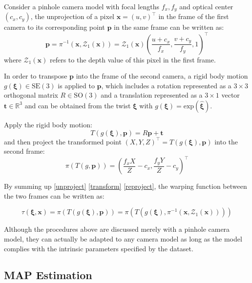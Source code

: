 \documentclass[acmsmall, nonacm, 11pt]{acmart}
\begin{document}
Consider a pinhole camera model with focal lengths $f_x, f_y$ and optical center $(c_x, c_y)$, the unprojection of a pixel $\mathbf{x} = (u, v)^{\top}$ in the frame of the first camera to its corresponding point $\mathbf{p}$ in the same frame can be written as:
\begin{equation}
\mathbf{p} = \pi^{-1}\left(\mathbf{x}, \mathcal{Z}_1(\mathbf{x})\right) = \mathcal{Z}_{1}(\mathbf{x})\left(\frac{u+c_x}{f_x}, \frac{v+c_y}{f_y}, 1\right)^{\top}
\label{unproject}
\end{equation}
\noindent where $\mathcal{Z}_1(\mathbf{x})$ refers to the depth value of this pixel in the first frame.

In order to transpose $\mathbf{p}$ into the frame of the second camera, a rigid body motion $g(\boldsymbol{\xi}) \in \mathrm{SE(3)}$ is applied to $\mathbf{p}$, which includes a rotation represented as a $3 \times 3$ orthogonal matrix $R \in \mathrm{SO(3)}$ and a translation represented as a $3 \times 1$ vector $\mathbf{t} \in \mathbb{R}^3$ and can be obtained from the twist $\boldsymbol{\xi}$ with $g(\boldsymbol{\xi}) = \mathrm{exp}(\hat{\boldsymbol{\xi}})$.

Apply the rigid body motion:
\begin{equation}
T(g(\boldsymbol{\xi}), \mathbf{p})=R \mathbf{p}+\mathbf{t}
\label{transform}
\end{equation}
and then project the transformed point $(X, Y, Z)^{\top} = T(g(\boldsymbol{\xi}), \mathbf{p})$ into the second frame:
\begin{equation}
\pi(T(g, \mathbf{p}))=\left(\frac{f_x X}{Z}-c_x, \frac{f_y Y}{Z}-c_y\right)^{\top}
\label{reproject}
\end{equation}

By summing up \eqref{unproject} \eqref{transform} \eqref{reproject}, the warping function between the two frames can be written as:

\begin{equation}
\tau(\boldsymbol{\xi}, \mathbf{x}) =\pi(T(g(\boldsymbol{\xi}), \mathbf{p})) = \pi\left(T\left(g(\boldsymbol{\xi}), \pi^{-1}\left(\mathbf{x}, \mathcal{Z}_1(\mathbf{x})\right)\right)\right)
\label{warpfunc}
\end{equation}

Although the procedures above are discussed merely with a pinhole camera model, they can actually be adapted to any camera model as long as the model complies with the intrinsic parameters specified by the dataset.

\subsection{MAP Estimation}
\end{document}

